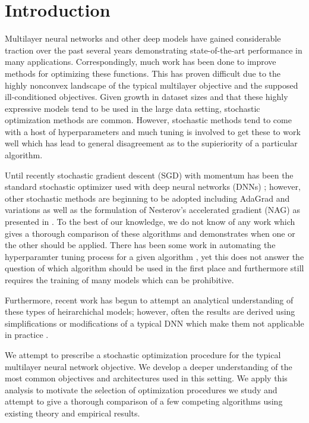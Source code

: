 \section{Introduction}

Multilayer neural networks and other deep models have gained considerable
traction over the past several years demonstrating state-of-the-art performance
in many applications. Correspondingly, much work has been done to improve
methods for optimizing these functions. This has proven difficult due to the
highly nonconvex landscape of the typical multilayer objective and the supposed 
ill-conditioned objectives. Given growth in dataset sizes and
that these highly expressive models tend to be used in the large data setting,
stochastic optimization methods are common. However, stochastic methods tend to
come with a host of hyperparameters and much tuning is involved to get these to
work well which has lead to general disagreement as to the supieriority of a
particular algorithm. 

Until recently stochastic gradient descent (SGD) with momentum has been the
standard stochastic optimizer used with deep neural networks (DNNs)
\cite{hinton_2010}; however, other stochastic methods are beginning to be
adopted including AdaGrad \cite{duchi_2011} and variations as well as the
formulation of Nesterov's accelerated gradient (NAG) as presented in
\cite{sutskever_2013}. To the best of our knowledge, we do not know of any work
which gives a thorough comparison of these algorithms and demonstrates when one
or the other should be applied. There has been some work in automating the
hyperparamter tuning process for a given algorithm \cite{snoek_2012}, yet this
does not answer the question of which algorithm should be used in the first
place and furthermore still requires the training of many models which can be
prohibitive. 

Furthermore, recent work has begun to attempt an analytical understanding of
these types of heirarchichal models; however, often the results are derived using
simplifications or modifications of a typical DNN which make them not
applicable in practice \cite{saxe_2013}. 

We attempt to prescribe a stochastic optimization procedure for the typical
multilayer neural network objective. We develop a deeper
understanding of the most common objectives and architectures used in this
setting. We apply this analysis to motivate the selection of optimization
procedures we study and attempt to give a thorough comparison of a few
competing algorithms using existing theory and empirical results. 

